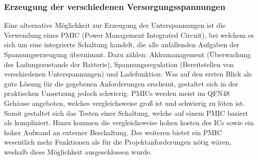 
\subsubsection{Erzeugung der verschiedenen Versorgungsspannungen}

Eine alternative Möglichkeit zur Erzeugung der Unterspannungen ist die Verwendung eines PMIC (Power Management Integrated Circuit), bei welchem es sich um eine integrierte Schaltung handelt, die alle anfallenden Aufgaben der Spannungserzeugung übernimmt. Dazu zählen: Akkumanagement (Überwachung des Ladungszustands der Batterie), Spannungsregulation (Bereitstellen von verschiedenen Unterspannungen) und  Ladefunktion. Was auf den ersten Blick als gute Lösung für die gegebenen Anforderungen erscheint, gestaltet sich in der praktischen Umsetzung jedoch schwierig. PMICs werden meist im QFN48 Gehäuse angeboten, welches vergleichsweise groß ist und schwierig zu löten ist. Somit gestaltet sich das Testen einer Schaltung, welche auf einem PMIC basiert als kompliziert. Hinzu kommen die vergleichsweise hohen kosten des ICs sowie ein hoher Aufwand an externer Beschaltung. Des weiteren bietet ein PMIC wesentlich mehr Funktionen als für die Projektanforderungen nötig wären, weshalb diese Möglichkeit ausgeschlossen wurde.\\